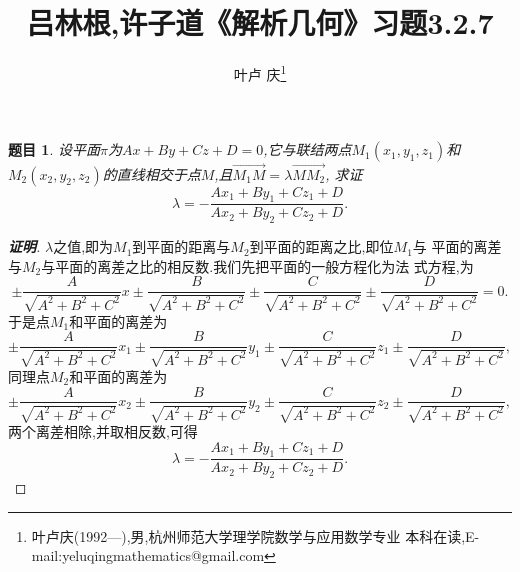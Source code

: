 \documentclass[a4paper]{article}
\newtheorem*{exe}{题目}
\newenvironment{exercise}
{\bigskip\begin{mdframed}\begin{exe}}
    {\end{exe}\end{mdframed}\bigskip}
\newcommand{\ov}{\overrightarrow} \newcommand{\sik}{\sum_{i=1}^k}
\begin{document}
\title{\huge{\bf{吕林根,许子道《解析几何》习题3.2.7}}} \author{\small{叶卢
    庆\footnote{叶卢庆(1992---),男,杭州师范大学理学院数学与应用数学专业
      本科在读,E-mail:yeluqingmathematics@gmail.com}}}
\maketitle
\begin{exercise}
  设平面$\pi$为$Ax+By+Cz+D=0$,它与联结两点$M_1(x_1,y_1,z_1)$和
  $M_2(x_2,y_2,z_2)$的直线相交于点$M$,且$\ov{M_1M}=\lambda \ov{MM_2}$,
  求证
$$
\lambda=-\frac{Ax_1+By_1+Cz_1+D}{Ax_2+By_2+Cz_2+D}.
$$
\end{exercise}
\begin{proof}[\textbf{证明}]
$\lambda$之值,即为$M_1$到平面的距离与$M_2$到平面的距离之比,即位$M_1$与
平面的离差与$M_2$与平面的离差之比的相反数.我们先把平面的一般方程化为法
式方程,为
$$
\pm\frac{A}{\sqrt{A^2+B^2+C^2}}x\pm\frac{B}{\sqrt{A^2+B^2+C^2}}\pm\frac{C}{\sqrt{A^2+B^2+C^2}}\pm\frac{D}{\sqrt{A^2+B^2+C^2}}=0.
$$
于是点$M_1$和平面的离差为
$$
\pm\frac{A}{\sqrt{A^2+B^2+C^2}}x_1\pm
\frac{B}{\sqrt{A^2+B^2+C^2}}y_{1}\pm \frac{C}{\sqrt{A^2+B^2+C^2}}z_{1}\pm \frac{D}{\sqrt{A^2+B^2+C^2}},
$$
同理点$M_2$和平面的离差为
$$
\pm\frac{A}{\sqrt{A^2+B^2+C^2}}x_2\pm
\frac{B}{\sqrt{A^2+B^2+C^2}}y_2\pm \frac{C}{\sqrt{A^2+B^2+C^2}}z_2\pm \frac{D}{\sqrt{A^2+B^2+C^2}},
$$
两个离差相除,并取相反数,可得
$$
\lambda=-\frac{Ax_1+By_1+Cz_1+D}{Ax_2+By_2+Cz_2+D}.
$$
\end{proof}
\end{document}
